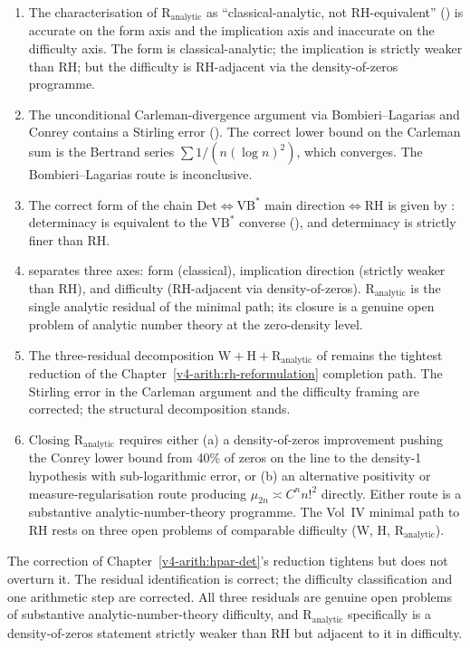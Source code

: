 \begin{enumerate}
\item The characterisation of \(\mathrm{R}_{\mathrm{analytic}}\) as
``classical-analytic, not RH-equivalent''
() is accurate on the form axis
and the implication axis and inaccurate on the difficulty axis.
The form is classical-analytic; the implication is strictly weaker
than RH; but the difficulty is RH-adjacent via the density-of-zeros
programme.
\item The unconditional Carleman-divergence argument via
Bombieri--Lagarias and Conrey contains a Stirling error
(). The correct lower bound
on the Carleman sum is the Bertrand series \(\sum 1/(n(\log n)^{2})\),
which converges. The Bombieri--Lagarias route is inconclusive.
\item The correct form of the chain
\(\mathrm{Det}\Leftrightarrow\mathrm{VB}^{*}\text{ main direction}
\Leftrightarrow\mathrm{RH}\) is given by
: determinacy is
equivalent to the \(\mathrm{VB}^{*}\) converse
(),
and determinacy is strictly finer than RH.
\item {} separates three
axes: form (classical), implication direction (strictly weaker than
RH), and difficulty (RH-adjacent via density-of-zeros).
\(\mathrm{R}_{\mathrm{analytic}}\) is the single analytic residual of
the minimal path; its closure is a genuine open problem of analytic
number theory at the zero-density level.
\item The three-residual decomposition
\(\mathrm{W}+\mathrm{H}+\mathrm{R}_{\mathrm{analytic}}\) of
 remains the tightest
reduction of the Chapter~\ref{v4-arith:rh-reformulation} completion path. The
Stirling error in the Carleman argument and the difficulty framing
are corrected; the structural decomposition stands.
\item Closing \(\mathrm{R}_{\mathrm{analytic}}\) requires either
(a) a density-of-zeros improvement pushing the Conrey lower bound
from 40\% of zeros on the line to the density-1 hypothesis with
sub-logarithmic error, or (b) an alternative positivity or
measure-regularisation route producing
\(\mu_{2n}\asymp C^{n}n!^{2}\) directly. Either route is a
substantive analytic-number-theory programme. The Vol~IV minimal
path to RH rests on three open problems of comparable difficulty
(W, H, \(\mathrm{R}_{\mathrm{analytic}}\)).
\end{enumerate}

The correction of Chapter~\ref{v4-arith:hpar-det}'s reduction
tightens but does not overturn it. The residual identification is
correct; the difficulty classification and one arithmetic step are
corrected. All three residuals are genuine open problems of
substantive analytic-number-theory difficulty, and
\(\mathrm{R}_{\mathrm{analytic}}\) specifically is a density-of-zeros
statement strictly weaker than RH but adjacent to it in difficulty.
